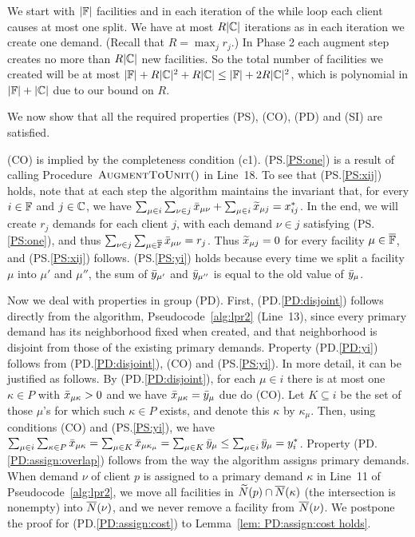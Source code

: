 \documentclass{llncs}
\begin{document}


We start with $|\mathbb{F}|$ facilities and in each
iteration of the while loop each client causes at most one split.  We
have at most $R|\mathbb{C}|$ iterations as in each
iteration we create one demand. (Recall that $R = \max_jr_j$.) In
Phase 2 each augment step creates
no more than $R|\mathbb{C}|$ new facilities.  So the total number of
facilities we created will be at most $|\mathbb{F}|+ R|\mathbb{C}|^2 +
R|\mathbb{C}| \leq |\mathbb{F}| + 2R|\mathbb{C}|^2$, which is
polynomial in $|\mathbb{F}|+|\mathbb{C}|$ due to our bound on
$R$.


\medskip

  We now show that all the required
properties (PS), (CO), (PD) and (SI) are satisfied.

(CO) is implied by the completeness condition (c1). (PS.\ref{PS:one}) is a result of
calling Procedure~${\textsc{AugmentToUnit}}()$ in Line~18. To see that
(PS.\ref{PS:xij}) holds, note that at each step the algorithm
maintains the invariant that, for every $i\in\mathbb{F}$ and
$j\in\mathbb{C}$, we have $\sum_{\mu\in i}\sum_{\nu \in j} {\bar x}_{\mu
  \nu} + \sum_{\mu\in i} {\widetilde x}_{\mu j} = x_{ij}^\ast$. In the end,
we will create $r_j$ demands for each client $j$, with each demand
$\nu\in j$ satisfying (PS.\ref{PS:one}), and thus $\sum_{\nu\in
  j}\sum_{\mu\in\overline{\mathbb{F}}}{\bar x}_{\mu\nu}=r_j$.  Thus
${\widetilde x}_{\mu j}=0$ for every facility $\mu\in\overline{\mathbb{F}}$, and
(PS.\ref{PS:xij}) follows.  (PS.\ref{PS:yi}) holds because every time
we split a facility $\mu$ into $\mu'$ and $\mu''$, the sum of
${\bar y}_{\mu'}$ and ${\bar y}_{\mu''}$ is equal to the old value of
${\bar y}_{\mu}$.

Now we deal with properties in group (PD).  First,
(PD.\ref{PD:disjoint}) follows directly from the algorithm,
Pseudocode~\ref{alg:lpr2} (Line~13), since every primary demand has
its neighborhood fixed when created, and that neighborhood is disjoint
from those of the existing primary demands. Property (PD.\ref{PD:yi})
follows from (PD.\ref{PD:disjoint}), (CO) and (PS.\ref{PS:yi}). In
more detail, it can be justified as follows. By
(PD.\ref{PD:disjoint}), for each $\mu\in i$ there is at most one
$\kappa\in P$ with ${\bar x}_{\mu\kappa} > 0$ and we have
${\bar x}_{\mu\kappa} = {\bar y}_{\mu}$ due do (CO).  Let $K\subseteq i$ be
the set of those $\mu$'s for which such $\kappa\in P$ exists, and
denote this $\kappa$ by $\kappa_\mu$. Then, using conditions (CO) and
(PS.\ref{PS:yi}), we have $ \sum_{\mu\in i}\sum_{\kappa\in
  P}{\bar x}_{\mu\kappa} = \sum_{\mu\in K}{\bar x}_{\mu\kappa_\mu} =
\sum_{\mu\in K}{\bar y}_{\mu} \leq \sum_{\mu\in i} {\bar y}_{\mu} =
y_i^\ast$. Property (PD.\ref{PD:assign:overlap}) follows from the way
the algorithm assigns primary demands.  When demand $\nu$ of client
$p$ is assigned to a primary demand $\kappa$ in Line~11 of
Pseudocode~\ref{alg:lpr2}, we move all facilities in ${\widetilde N}(p)\cap
{\overline{N}}(\kappa)$ (the intersection is nonempty) into ${\overline{N}}(\nu)$, and
we never remove a facility from ${\overline{N}}(\nu)$.  We postpone the proof
for (PD.\ref{PD:assign:cost}) to Lemma~\ref{lem: PD:assign:cost
  holds}.
\end{document}
